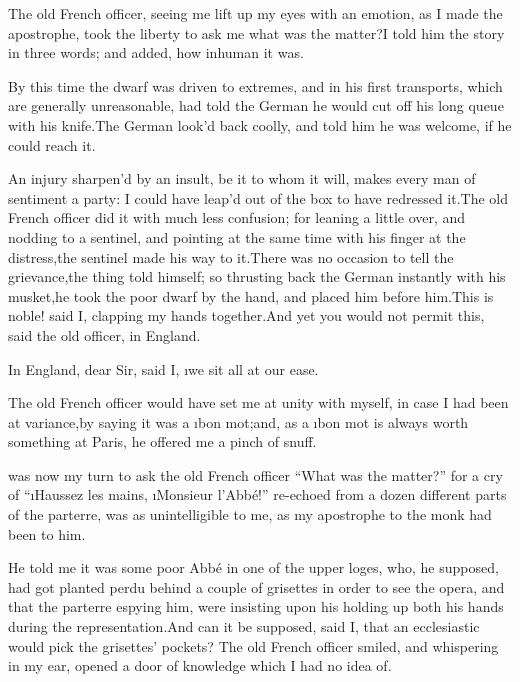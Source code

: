 \documentclass[twoside]{article}
\begin{document}
The old French officer, seeing me lift up my eyes with an emotion, as I
made the apostrophe, took the liberty to ask me what was the matter?\tsk I
told him the story in three words; and added, how inhuman it was.

By this time the dwarf was driven to extremes, and in his first
transports, which are generally unreasonable, had told the German he
would cut off his long queue with his knife.\tsk The German look’d back
coolly, and told him he was welcome, if he could reach it.

An injury sharpen’d by an insult, be it to whom it will, makes every man
of sentiment a party: I could have leap’d out of the box to have
redressed it.\tsk The old French officer did it with much less confusion; for
leaning a little over, and nodding to a sentinel, and pointing at the
same time with his finger at the distress,\tsk the sentinel made his way to
it.\tsk There was no occasion to tell the grievance,\tsk the thing told himself;
so thrusting back the German instantly with his musket,\tsk he took the poor
dwarf by the hand, and placed him before him.\tsk This is noble! said I,
clapping my hands together.\tsk And yet you would not permit this, said the
old officer, in England.

\tsk In England, dear Sir, said I, \i{we sit all at our ease}.

The old French officer would have set me at unity with myself, in case I
had been at variance,\tsk by saying it was a \i{bon mot};\tsk and, as a \i{bon mot}
is always worth something at Paris, he offered me a pinch of snuff.






 was now my turn to ask the old French officer “What was the matter?”
for a cry of “\i{Haussez les mains}, \i{Monsieur l’Abbé}!” re-echoed from a
dozen different parts of the parterre, was as unintelligible to me, as my
apostrophe to the monk had been to him.

He told me it was some poor Abbé in one of the upper loges, who, he
supposed, had got planted perdu behind a couple of grisettes in order to
see the opera, and that the parterre espying him, were insisting upon his
holding up both his hands during the representation.\tsk And can it be
supposed, said I, that an ecclesiastic would pick the grisettes’ pockets?
The old French officer smiled, and whispering in my ear, opened a door of
knowledge which I had no idea of.
\end{document}
